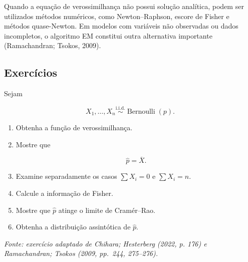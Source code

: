 \documentclass[
  letterpaper,
  DIV=11,
  numbers=noendperiod]{scrreprt}
\begin{document}
Quando a equação de verossimilhança não possui solução analítica, podem
ser utilizados métodos numéricos, como Newton--Raphson, escore de Fisher
e métodos quase-Newton. Em modelos com variáveis não observadas ou dados
incompletos, o algoritmo EM constitui outra alternativa importante
(Ramachandran; Tsokos, 2009).

\subsection{Exercícios}\label{exercuxedcios-3}

\begin{tcolorbox}[enhanced jigsaw, colback=white, leftrule=.75mm, colbacktitle=quarto-callout-tip-color!10!white, breakable, titlerule=0mm, bottomtitle=1mm, title=\textcolor{quarto-callout-tip-color}{\faLightbulb}\hspace{0.5em}{Exercício 1 --- Modelo Bernoulli}, colframe=quarto-callout-tip-color-frame, toprule=.15mm, opacityback=0, bottomrule=.15mm, opacitybacktitle=0.6, arc=.35mm, toptitle=1mm, rightrule=.15mm, coltitle=black, left=2mm]

Sejam

\[X_1,\ldots,X_n
\overset{\mathrm{i.i.d.}}{\sim}
\operatorname{Bernoulli}(p).\]

\begin{enumerate}
\def\labelenumi{\arabic{enumi}.}
\item
  Obtenha a função de verossimilhança.
\item
  Mostre que

  \[\widehat p
  =
  \overline X.\]
\item
  Examine separadamente os casos \(\sum X_i=0\) e \(\sum X_i=n\).
\item
  Calcule a informação de Fisher.
\item
  Mostre que \(\widehat p\) atinge o limite de Cramér--Rao.
\item
  Obtenha a distribuição assintótica de \(\widehat p\).
\end{enumerate}

\emph{Fonte: exercício adaptado de Chihara; Hesterberg (2022, p. 176) e
Ramachandran; Tsokos (2009, pp.~244, 275--276).}

\end{tcolorbox}
\end{document}
